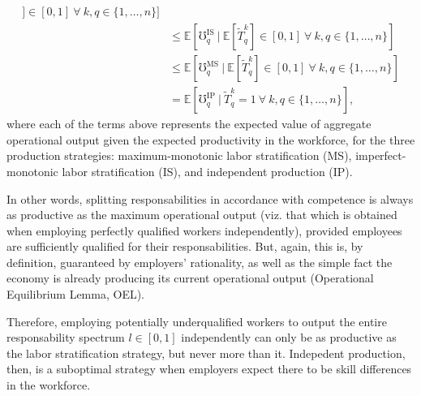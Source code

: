 \documentclass[hidelinks, nonatbib]{elsarticle}
\begin{document}
\begin{enumerate}
\begin{enumerate}
\begin{enumerate}
\begin{align}
                    ]
                    \in [0,1]
                    \
                    \forall
                    \
                    k,q \in \{1, \dots, n\}
                ]
                \\
                &\leq
                \mathbb{E}[
                    \mho_{q}^{\text{IS}}
                    \
                    |
                    \
                    \mathbb{E}[
                        \tilde{T}_{q}^{k}
                    ]
                    \in [0,1]
                    \
                    \forall
                    \
                    k,q \in \{1, \dots, n\}
                ]
                \\
                &\leq
                \mathbb{E}[
                    \mho_{q}^{\text{MS}}
                    \
                    |
                    \
                    \mathbb{E}[
                        \tilde{T}_{q}^{k}
                    ]
                    \in [0,1]
                    \
                    \forall
                    \
                    k,q \in \{1, \dots, n\}
                ]
                \\
                &=
                \mathbb{E}[
                    \mho_{q}^{\text{IP}}
                    \
                    |
                    \
                    \tilde{T}_{q}^{k}
                    = 1
                    \
                    \forall
                    \
                    k,q \in \{1, \dots, n\}
                ]
                ,
            \end{align}
            where each of the terms above represents the expected value of aggregate operational output given the expected productivity in the workforce, for the three production strategies: maximum-monotonic labor stratification (MS), imperfect-monotonic labor stratification (IS), and independent production (IP).

            In other words, splitting responsabilities in accordance with competence is always as productive as the maximum operational output (viz. that which is obtained when employing perfectly qualified workers independently), provided employees are sufficiently qualified for their responsabilities. But, again, this is, by definition, guaranteed by employers' rationality, as well as the simple fact the economy is already producing its current operational output (Operational Equilibrium Lemma, OEL). 
            
            Therefore, employing potentially underqualified workers to output the entire responsability spectrum $l \in [0,1]$ independently can only be as productive as the labor stratification strategy, but never more than it. Indepedent production, then, is a suboptimal strategy when employers expect there to be skill differences in the workforce.
            

\end{enumerate}
\end{enumerate}
\end{enumerate}
\end{document}
